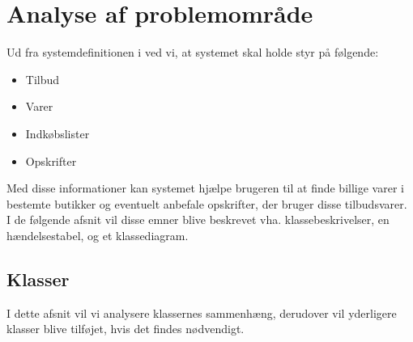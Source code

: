 \section{Analyse af problemområde}

Ud fra systemdefinitionen i  ved vi, at systemet skal holde styr på følgende:

\begin{itemize}[noitemsep,nolistsep]
	\item Tilbud
	\item Varer
	\item Indkøbslister
	\item Opskrifter
\end{itemize}

Med disse informationer kan systemet hjælpe brugeren til at finde billige varer i bestemte butikker og eventuelt anbefale opskrifter, der bruger disse tilbudsvarer.
I de følgende afsnit vil disse emner blive beskrevet vha. klassebeskrivelser, en hændelsestabel, og et klassediagram.

\subsection{Klasser}
I dette afsnit vil vi analysere klassernes sammenhæng, derudover vil yderligere klasser blive tilføjet, hvis det findes nødvendigt.

